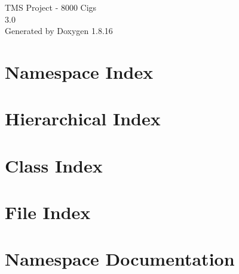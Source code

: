 \let\mypdfximage\pdfximage\def\pdfximage{\immediate\mypdfximage}\documentclass[twoside]{book}
\newcommand{\+}{\discretionary{\mbox{\scriptsize$\hookleftarrow$}}{}{}}
\newcommand{\clearemptydoublepage}{%
  \newpage{\pagestyle{empty}\cleardoublepage}%
}
\begin{document}
\hypersetup{pageanchor=false,
             bookmarksnumbered=true,
             pdfencoding=unicode
            }
\begin{titlepage}
\vspace*{7cm}
\begin{center}%
{\Large T\+MS Project -\/ 8000 Cigs \\[1ex]\large 3.\+0 }\\
\vspace*{1cm}
{\large Generated by Doxygen 1.8.16}\\
\end{center}
\end{titlepage}
\clearemptydoublepage
{}
\tableofcontents
\clearemptydoublepage
{}
\hypersetup{pageanchor=true}

\chapter{Namespace Index}

\chapter{Hierarchical Index}

\chapter{Class Index}

\chapter{File Index}

\chapter{Namespace Documentation}






\end{document}
